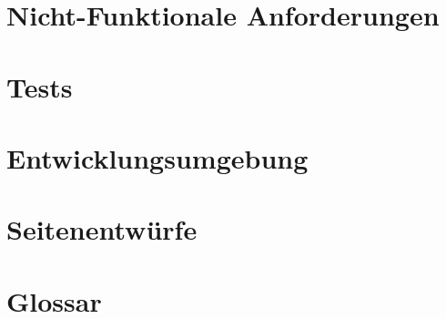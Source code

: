 \documentclass[parskip=full,11pt,twoside]{scrartcl}
\begin{document}



\section{Nicht-Funktionale Anforderungen}





\section{Tests}




\section{Entwicklungsumgebung}

\pagebreak
\appendix

\section{Seitenentwürfe}




\section{Glossar}

\end{document}
